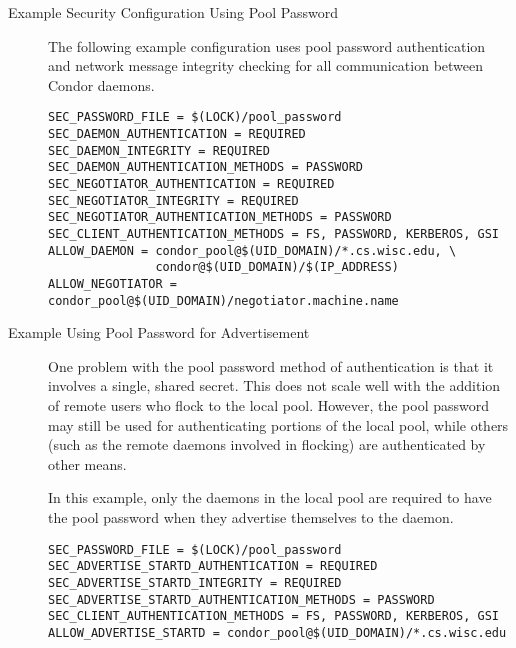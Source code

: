 \begin{description}
\item[Example Security Configuration Using Pool Password]
The following example configuration uses pool password authentication and
network message integrity checking for all communication between Condor
daemons.

\begin{verbatim}
SEC_PASSWORD_FILE = $(LOCK)/pool_password
SEC_DAEMON_AUTHENTICATION = REQUIRED
SEC_DAEMON_INTEGRITY = REQUIRED
SEC_DAEMON_AUTHENTICATION_METHODS = PASSWORD
SEC_NEGOTIATOR_AUTHENTICATION = REQUIRED
SEC_NEGOTIATOR_INTEGRITY = REQUIRED
SEC_NEGOTIATOR_AUTHENTICATION_METHODS = PASSWORD
SEC_CLIENT_AUTHENTICATION_METHODS = FS, PASSWORD, KERBEROS, GSI
ALLOW_DAEMON = condor_pool@$(UID_DOMAIN)/*.cs.wisc.edu, \
               condor@$(UID_DOMAIN)/$(IP_ADDRESS)
ALLOW_NEGOTIATOR = condor_pool@$(UID_DOMAIN)/negotiator.machine.name
\end{verbatim}


\item[Example Using Pool Password for  Advertisement]

One problem with the pool password method of authentication is that it
involves a single, shared secret.
This does not scale well with the addition of
remote users who flock to the local pool.
However, the pool password may still be used for authenticating portions
of the local pool, while others
(such as the remote  daemons involved in flocking)
are authenticated by other means.

In this example, only the  daemons in the local pool
are required to have the
pool password when they advertise themselves to the  daemon.

\begin{verbatim}
SEC_PASSWORD_FILE = $(LOCK)/pool_password
SEC_ADVERTISE_STARTD_AUTHENTICATION = REQUIRED
SEC_ADVERTISE_STARTD_INTEGRITY = REQUIRED
SEC_ADVERTISE_STARTD_AUTHENTICATION_METHODS = PASSWORD
SEC_CLIENT_AUTHENTICATION_METHODS = FS, PASSWORD, KERBEROS, GSI
ALLOW_ADVERTISE_STARTD = condor_pool@$(UID_DOMAIN)/*.cs.wisc.edu
\end{verbatim}

\end{description}

